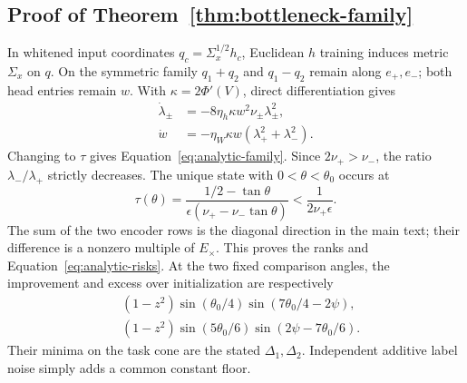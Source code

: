 \subsection{Proof of Theorem~\ref{thm:bottleneck-family}}
In whitened input coordinates $q_c=\Sigma_x^{1/2}h_c$, Euclidean $h$ training induces metric $\Sigma_x$ on $q$. On the symmetric family $q_1+q_2$ and $q_1-q_2$ remain along $e_+,e_-$; both head entries remain $w$. With $\kappa=2\Phi'(V)$, direct differentiation gives
\begin{align}
 \dot\lambda_\pm&=-8\eta_h\kappa w^2\nu_\pm\lambda_\pm^2,\\
 \dot w&=-\eta_W\kappa w(\lambda_+^2+\lambda_-^2).
\end{align}
Changing to $\tau$ gives Equation~\eqref{eq:analytic-family}. Since $2\nu_+>\nu_-$, the ratio $\lambda_-/\lambda_+$ strictly decreases. The unique state with $0<\theta<\theta_0$ occurs at
\begin{equation}
 \tau(\theta)=\frac{1/2-\tan\theta}{\epsilon(\nu_+-\nu_-\tan\theta)}
 <\frac1{2\nu_+\epsilon}.
\end{equation}
The sum of the two encoder rows is the diagonal direction in the main text; their difference is a nonzero multiple of $E_\times$. This proves the ranks and Equation~\eqref{eq:analytic-risks}. At the two fixed comparison angles, the improvement and excess over initialization are respectively
\begin{align}
 &(1-z^2)\sin(\theta_0/4)\sin(7\theta_0/4-2\psi),\\
 &(1-z^2)\sin(5\theta_0/6)\sin(2\psi-7\theta_0/6).
\end{align}
Their minima on the task cone are the stated $\Delta_1,\Delta_2$. Independent additive label noise simply adds a common constant floor.

